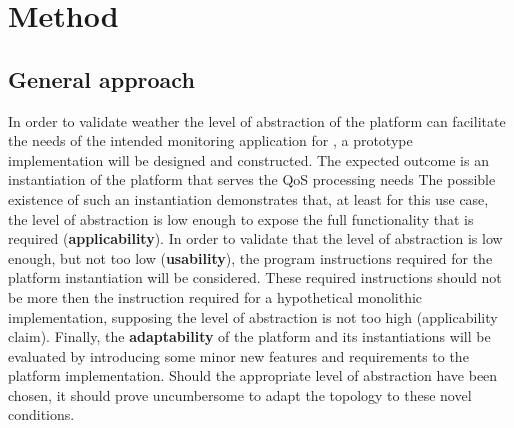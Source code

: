 
	
\section{Method}
\label{sec:val:method}
\subsection{General approach} 
In order to validate weather the level of abstraction of the platform can facilitate the needs of the intended monitoring application for \sensit, a prototype implementation will be designed and constructed. The expected outcome is an instantiation of the platform that serves the QoS processing needs The possible existence of such an instantiation demonstrates that, at least for this use case, the level of abstraction is low enough to expose the full functionality that is required  (\textbf{applicability}). In order to validate that the level of abstraction is low enough, but not too low (\textbf{usability}), the program instructions required for the platform instantiation will be considered. These required instructions should not be more then the instruction required for a hypothetical monolithic implementation, supposing the level of abstraction is not too high (applicability claim). Finally, the \textbf{adaptability} of the platform and its instantiations will be evaluated by introducing some minor new features and requirements to the platform implementation. Should the appropriate level of abstraction have been chosen, it should prove uncumbersome to adapt the topology to these novel conditions.

